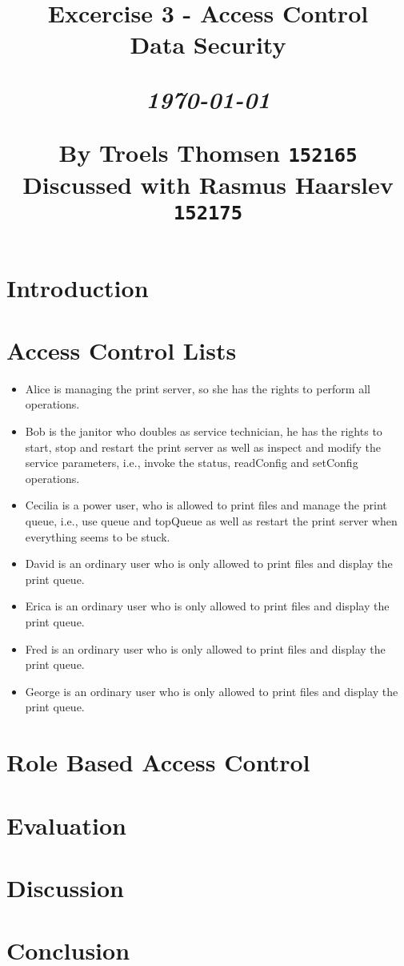 \documentclass[12pt]{article}
\title{
  \vspace{4cm}
  \begin{flushleft}
  \Large{\textbf{Excercise 3 - Access Control}} \\
  \large{Data Security} \\
  \end{flushleft}
  \vspace{0cm}
  \begin{flushleft}
  \small
  \textit{\today}
  \end{flushleft}
  \vspace{12cm}
  \begin{flushleft}
  \small
  By Troels Thomsen \texttt{152165}\\
  Discussed with Rasmus Haarslev \texttt{152175}
  \end{flushleft}
}
\date{
}
\begin{document}
\clearpage
{}
\thispagestyle{empty}
\maketitle

\newpage

\tableofcontents

\newpage


\section{Introduction}
\label{sec:Introduction}

\newpage

\section{Access Control Lists}
\label{sec:Access Control Lists}

\begin{itemize}
    \item Alice is managing the print server, so she has the rights to perform all operations.
    \item Bob is the janitor who doubles as service technician, he has the rights to start, stop and restart the print server as well as inspect and modify the service parameters, i.e., invoke the status, readConfig and setConfig operations.
    \item Cecilia is a power user, who is allowed to print files and manage the print queue, i.e., use queue and topQueue as well as restart the print server when everything seems to be stuck.
    \item David is an ordinary user who is only allowed to print files and display the print queue.
    \item Erica is an ordinary user who is only allowed to print files and display the print queue.
    \item Fred is an ordinary user who is only allowed to print files and display the print queue.
    \item George is an ordinary user who is only allowed to print files and display the print queue.
\end{itemize}


\newpage

\section{Role Based Access Control}
\label{sec:Role Based Access Control}

\newpage

\section{Evaluation}
\label{sec:Evaluation}

\newpage

\section{Discussion}
\label{sec:Discussion}

\newpage

\section{Conclusion}
\label{sec:Conclusion}
\end{document}
